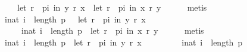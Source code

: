 \begin{isabellebody}
\ \ \ \ \ \ {\isasymnot}\ {\isacharparenleft}{\kern0pt}let\ r\ {\isacharequal}{\kern0pt}\ {\isacharparenleft}{\kern0pt}p{\isacharbang}{\kern0pt}i{\isacharparenright}{\kern0pt}\ in\ {\isacharparenleft}{\kern0pt}y\ {\isasympreceq}\isactrlsub r\ x{\isacharparenright}{\kern0pt}{\isacharparenright}{\kern0pt}\ {\isacharequal}{\kern0pt}\ {\isacharparenleft}{\kern0pt}let\ r\ {\isacharequal}{\kern0pt}\ {\isacharparenleft}{\kern0pt}p{\isacharbang}{\kern0pt}i{\isacharparenright}{\kern0pt}\ in\ {\isacharparenleft}{\kern0pt}x\ {\isasympreceq}\isactrlsub r\ y{\isacharparenright}{\kern0pt}{\isacharparenright}{\kern0pt}{\isachardoublequoteclose}\isanewline
\ \ \ \ \isamarkupfalse%
\ metis\isanewline
\ \ \isamarkupfalse%
\ {}{\isacharcolon}{\kern0pt}\isanewline
\ \ \ \ {\isachardoublequoteopen}{\isacharbraceleft}{\kern0pt}i{\isacharcolon}{\kern0pt}{\isacharcolon}{\kern0pt}nat{\isachardot}{\kern0pt}\ i\ {\isacharless}{\kern0pt}\ length\ p\ {\isasymand}\ {\isasymnot}\ {\isacharparenleft}{\kern0pt}let\ r\ {\isacharequal}{\kern0pt}\ {\isacharparenleft}{\kern0pt}p{\isacharbang}{\kern0pt}i{\isacharparenright}{\kern0pt}\ in\ {\isacharparenleft}{\kern0pt}y\ {\isasympreceq}\isactrlsub r\ x{\isacharparenright}{\kern0pt}{\isacharparenright}{\kern0pt}{\isacharbraceright}{\kern0pt}\ {\isacharequal}{\kern0pt}\isanewline
\ \ \ \ \ \ \ \ {\isacharbraceleft}{\kern0pt}i{\isacharcolon}{\kern0pt}{\isacharcolon}{\kern0pt}nat{\isachardot}{\kern0pt}\ i\ {\isacharless}{\kern0pt}\ length\ p\ {\isasymand}\ {\isacharparenleft}{\kern0pt}let\ r\ {\isacharequal}{\kern0pt}\ {\isacharparenleft}{\kern0pt}p{\isacharbang}{\kern0pt}i{\isacharparenright}{\kern0pt}\ in\ {\isacharparenleft}{\kern0pt}x\ {\isasympreceq}\isactrlsub r\ y{\isacharparenright}{\kern0pt}{\isacharparenright}{\kern0pt}{\isacharbraceright}{\kern0pt}{\isachardoublequoteclose}\isanewline
\ \ \ \ \isamarkupfalse%
\ metis\isanewline
\ \ \isamarkupfalse%
\ {}{}{\isacharcolon}{\kern0pt}\isanewline
\ \ \ \ {\isachardoublequoteopen}{\isacharbraceleft}{\kern0pt}i{\isacharcolon}{\kern0pt}{\isacharcolon}{\kern0pt}nat{\isachardot}{\kern0pt}\ i\ {\isacharless}{\kern0pt}\ length\ p\ {\isasymand}\ {\isacharparenleft}{\kern0pt}let\ r\ {\isacharequal}{\kern0pt}\ {\isacharparenleft}{\kern0pt}p{\isacharbang}{\kern0pt}i{\isacharparenright}{\kern0pt}\ in\ {\isacharparenleft}{\kern0pt}y\ {\isasympreceq}\isactrlsub r\ x{\isacharparenright}{\kern0pt}{\isacharparenright}{\kern0pt}{\isacharbraceright}{\kern0pt}\ {\isacharequal}{\kern0pt}\isanewline
\ \ \ \ \ \ \ \ {\isacharbraceleft}{\kern0pt}i{\isacharcolon}{\kern0pt}{\isacharcolon}{\kern0pt}nat{\isachardot}{\kern0pt}\ i\ {\isacharless}{\kern0pt}\ length\ p{\isacharbraceright}{\kern0pt}\ {\isacharminus}{\kern0pt}\isanewline

\end{isabellebody}
